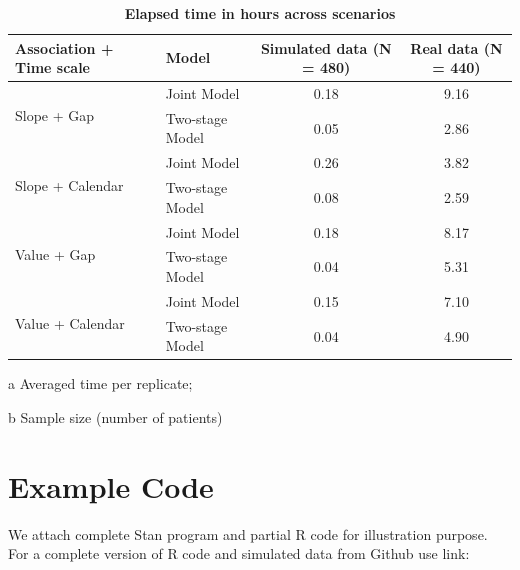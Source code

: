 \begin{table}[H] 
  \small\sf\centering
    \caption{\bf Elapsed time in hours across scenarios}
 \begin{threeparttable}
\begin{tabular}{l|l|c|c}
\toprule
Association + Time scale & Model & Simulated data\tnote{a} (N\tnote{b} = 480) & Real data (N\tnote{c} = 440) \\ \hline
\multirow{2}{*}{Slope + Gap} & Joint Model &  0.18 & 9.16\\
                             & Two-stage Model & 0.05 & 2.86\\ \hline
\multirow{2}{*}{Slope + Calendar} & Joint Model & 0.26 & 3.82\\
                                  & Two-stage Model & 0.08 & 2.59 \\ \hline
\multirow{2}{*}{Value + Gap} & Joint Model & 0.18 & 8.17\\ 
                             & Two-stage Model & 0.04 & 5.31 \\ \hline
\multirow{2}{*}{Value + Calendar} & Joint Model & 0.15 & 7.10 \\              
                                           & Two-stage Model & 0.04 & 4.90\\
\bottomrule
\end{tabular}
 \begin{tablenotes}[para]
    \footnotesize
    \item[a] Averaged time per replicate; \item [b] Sample size (number of patients)
    \end{tablenotes}
 \end{threeparttable}
 \label{tab:time}
\end{table}


\section{Example Code}

We attach complete Stan program and partial R code for illustration purpose. For a complete version of R code and simulated data from Github use link: 


